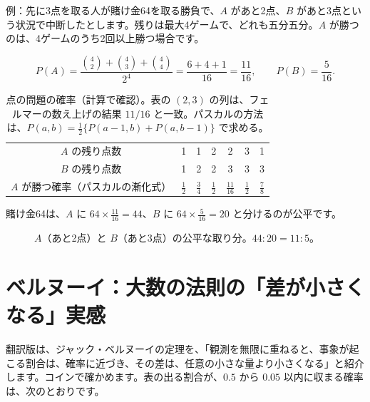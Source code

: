 \documentclass[a4paper,11pt,openany]{ltjsbook}
\begin{document}
例：先に3点を取る人が賭け金64を取る勝負で、$A$ があと2点、$B$ があと3点という状況で中断したとします。残りは最大4ゲームで、どれも五分五分。$A$ が勝つのは、4ゲームのうち2回以上勝つ場合です。

\[
P(A)=\frac{\binom42+\binom43+\binom44}{2^4}=\frac{6+4+1}{16}=\frac{11}{16},\qquad P(B)=\frac5{16}.
\]

\begin{table}[htbp]
\centering
\begin{tabular}{c|cccccc}
\toprule
$A$ の残り点数 & 1 & 1 & 2 & 2 & 3 & 1\\
$B$ の残り点数 & 1 & 2 & 2 & 3 & 3 & 3\\
\midrule
$A$ が勝つ確率（パスカルの漸化式） & $\tfrac12$ & $\tfrac34$ & $\tfrac12$ & $\tfrac{11}{16}$ & $\tfrac12$ & $\tfrac78$\\
\bottomrule
\end{tabular}
\caption{点の問題の確率（計算で確認）。表の $(2,3)$ の列は、フェルマーの数え上げの結果 $11/16$ と一致。パスカルの方法は、$P(a,b)=\tfrac12\{P(a-1,b)+P(a,b-1)\}$ で求める。}
\end{table}

賭け金64は、$A$ に $64\times\tfrac{11}{16}=44$、$B$ に $64\times\tfrac5{16}=20$ と分けるのが公平です。

\begin{figure}[htbp]
\centering
{}
\caption{$A$（あと2点）と $B$（あと3点）の公平な取り分。$44:20=11:5$。}
\end{figure}

\section{ベルヌーイ：大数の法則の「差が小さくなる」実感}

翻訳版は、ジャック・ベルヌーイの定理を、「観測を無限に重ねると、事象が起こる割合は、確率に近づき、その差は、任意の小さな量より小さくなる」と紹介します。コインで確かめます。表の出る割合が、$0.5$ から $0.05$ 以内に収まる確率は、次のとおりです。
\end{document}
